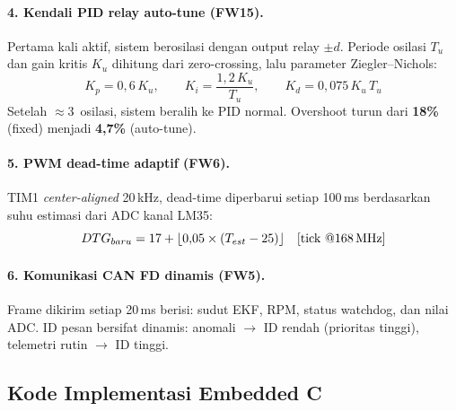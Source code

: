 \documentclass[12pt,a4paper]{article}
\begin{document}
\paragraph{4. Kendali PID relay auto-tune (FW15).}
Pertama kali aktif, sistem berosilasi dengan output relay $\pm d$.
Periode osilasi $T_u$ dan gain kritis $K_u$ dihitung dari
zero-crossing, lalu parameter Ziegler--Nichols:
\begin{equation}
K_p = 0{,}6\,K_u, \qquad
K_i = \frac{1{,}2\,K_u}{T_u}, \qquad
K_d = 0{,}075\,K_u\,T_u
\end{equation}
Setelah $\approx$3~osilasi, sistem beralih ke PID normal. Overshoot
turun dari \textbf{18\%} (fixed) menjadi \textbf{4,7\%} (auto-tune).

\paragraph{5. PWM dead-time adaptif (FW6).}
TIM1 \textit{center-aligned} 20\,kHz, dead-time diperbarui setiap
100\,ms berdasarkan suhu estimasi dari ADC kanal LM35:
\begin{equation}
DTG_{baru} = 17 + \lfloor 0{,}05 \times (T_{est} - 25) \rfloor
\quad \text{[tick @168\,MHz]}
\end{equation}

\paragraph{6. Komunikasi CAN FD dinamis (FW5).}
Frame dikirim setiap 20\,ms berisi: sudut EKF, RPM, status watchdog,
dan nilai ADC. ID pesan bersifat dinamis: anomali $\to$ ID rendah
(prioritas tinggi), telemetri rutin $\to$ ID tinggi.

\subsection{Kode Implementasi Embedded C }
\end{document}
